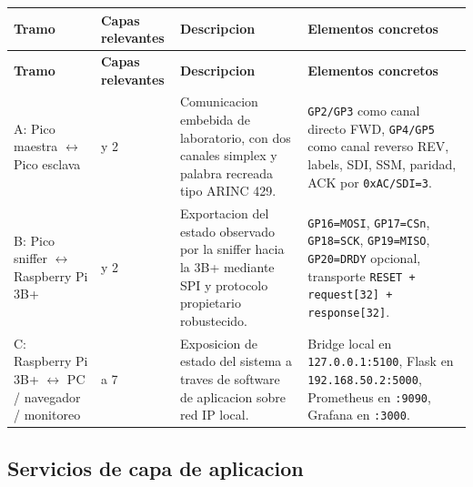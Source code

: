 \documentclass[12pt,a4paper]{article}
\begin{document}
\begin{longtable}{>{\raggedright\arraybackslash}p{2.8cm} >{\raggedright\arraybackslash}p{2.2cm} >{\raggedright\arraybackslash}p{4.2cm} >{\raggedright\arraybackslash}p{5.8cm}}
\toprule
\textbf{Tramo} & \textbf{Capas relevantes} & \textbf{Descripcion} & \textbf{Elementos concretos} \\
\midrule
\endfirsthead
\toprule
\textbf{Tramo} & \textbf{Capas relevantes} & \textbf{Descripcion} & \textbf{Elementos concretos} \\
\midrule
\endhead
A: Pico maestra $\leftrightarrow$ Pico esclava & 1 y 2 & Comunicacion embebida de laboratorio, con dos canales simplex y palabra recreada tipo ARINC 429. & \texttt{GP2/GP3} como canal directo FWD, \texttt{GP4/GP5} como canal reverso REV, labels, SDI, SSM, paridad, ACK por \texttt{0xAC/SDI=3}. \\
\midrule
B: Pico sniffer $\leftrightarrow$ Raspberry Pi 3B+ & 1 y 2 & Exportacion del estado observado por la sniffer hacia la 3B+ mediante SPI y protocolo propietario robustecido. & \texttt{GP16=MOSI}, \texttt{GP17=CSn}, \texttt{GP18=SCK}, \texttt{GP19=MISO}, \texttt{GP20=DRDY} opcional, transporte \texttt{RESET + request[32] + response[32]}. \\
\midrule
C: Raspberry Pi 3B+ $\leftrightarrow$ PC / navegador / monitoreo & 3 a 7 & Exposicion de estado del sistema a traves de software de aplicacion sobre red IP local. & Bridge local en \texttt{127.0.0.1:5100}, Flask en \texttt{192.168.50.2:5000}, Prometheus en \texttt{:9090}, Grafana en \texttt{:3000}. \\
\bottomrule
\end{longtable}

\subsection*{Servicios de capa de aplicacion}
\end{document}
